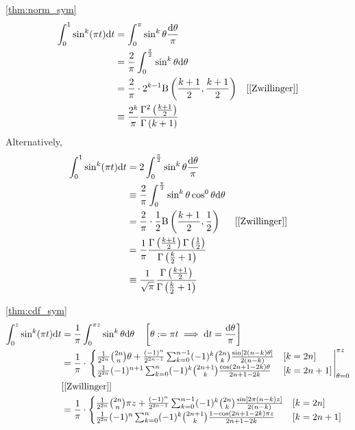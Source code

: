 \begin{proofof}{\autoref{thm:norm_sym}}
        \begin{align*}
        \int_0^1 \sin^k(\pi t) \d t
        & = \int_0^\pi \sin^k \theta \frac{\d \theta}{\pi}\\
        &= \frac{2}{\pi} \int_0^{\frac{\pi}{2}} \sin^k \theta \d \theta\\
        & = \frac{2}{\pi} \cdot 2^{k-1} \Beta \left(\frac{k+1}{2}, \frac{k+1}{2}\right) &\text{[\cite[Eq. 3.621 (1)]{Zwillinger}]}\\
        & \equiv \frac{2^k}{\pi} \frac{\Gamma^2\left( \frac{k+1}{2} \right)}{\Gamma\left( k+1\right)}
    \end{align*}
    Alternatively,
    \begin{align*}
        \int_0^1 \sin^k(\pi t) \d t
        &= 2 \int_0^{\frac{\pi}{2}} \sin^k \theta \frac{\d \theta}{\pi}\\
        &\equiv \frac{2}{\pi} \int_0^{\frac{\pi}{2}} \sin^k \theta \cos^0 \theta \d \theta\\
        & = \frac{2}{\pi} \cdot \frac{1}{2} \Beta \left(\frac{k+1}{2}, \frac{1}{2}\right) &\text{[\cite[Eq. 3.621 (5)]{Zwillinger}]}\\
        &= \frac{1}{\pi} \frac{\Gamma\left(\frac{k+1}{2}\right) \Gamma\left(\frac{1}{2} \right)}{\Gamma\left(\frac{k}{2} + 1\right)}\\
        &\equiv \frac{1}{\sqrt \pi} \frac{\Gamma\left(\frac{k+1}{2}\right)}{\Gamma\left(\frac{k}{2} + 1\right)}
    \end{align*}
\end{proofof}

\begin{proofof}{\autoref{thm:cdf_sym}}
    \begin{align*}
        \int_0^z \sin^k (\pi t) \d t &= \frac 1 \pi \int_0^{\pi z} \sin^k \theta \d \theta  \quad \hfill  \left[\theta := \pi t \implies \d t = \frac{\d \theta}{\pi}\right]\\
        &= \frac{1}{\pi} \cdot \left. \begin{cases}
            \frac{1}{2^{2n}} {2n \choose n} \theta + \frac{(-1)^n}{2^{2n-1}}\sum_{k=0}^{n-1} (-1)^k {2n \choose k} \frac{\sin[2(n-k)\theta]}{2(n-k)} & [k=2n]\\
            \frac{1}{2^{2n}}(-1)^{n+1} \sum_{k=0}^n (-1)^k {2n+1 \choose k} \frac{\cos (2n+1-2k)\theta}{2n+1-2k} & [k=2n+1]
        \end{cases} \right|_{\theta=0}^{\pi z} \\
        & \hfill \text{[\cite[Eq. 2.513-1,2]{Zwillinger}]} \\
        &= \frac{1}{\pi} \cdot \begin{cases}
             \frac{1}{2^{2n}} {2n \choose n} \pi z + \frac{(-1)^n}{2^{2n-1}}\sum_{k=0}^{n-1} (-1)^k {2n \choose k} \frac{\sin [2\pi (n-k) z]}{2(n-k)} & [k=2n]\\
        \frac{1}{2^{2n}}(-1)^n \sum_{k=0}^n (-1)^k {2n+1 \choose k} \frac{1 - \cos (2n+1-2k)\pi z}{2n+1-2k} & [k=2n+1]
        \end{cases}
    \end{align*}
\end{proofof}

